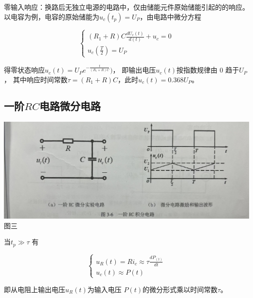 \documentclass[a4paper]{article}
\begin{document}
    {{零输入响应：换路后无独立电源的电路中，仅由储能元件原始储能引起的的响应。 以电容为例，电容的原始储能为$u_{c}(t_{p}) = U_{P}$，由电路中微分方程}}

    \begin{equation}
        \left\{
        \begin{array}{c}
        (R_{1}+R)
            C\frac{d U_{c}(t)}{d (t)}+u_{c}=0 \\
            u_{c}(\frac{T}{2})=U_{P}
        \end{array}
        \right.\label{eq:equation2}
    \end{equation}

    {{得零状态响应$u_{c}(t) = U_{P} e^{-\frac{t}{(R_{1}+R)C}})$， 即输出电压$u_{c}(t)$按指数规律由 0 趋于$U_{P}$， 其中响应时间常数$\tau =(R_{1}+R)C$，此时$u_{c}(t)=0.368U_{P}$。}}

    \subsection{一阶$RC$电路微分电路}\label{subsec:$rc$2}
    \begin{center}
        \includegraphics[scale=0.09]{2}\\
        {\small 图三}
    \end{center}

    {{当$t_{p}\gg\tau$ 有}}

    \begin{equation}
        \left\{
        \begin{array}{c}
            u_{R}(t)=Ri_{c} \approx \tau \frac{d P_(t)}{d t} \\
            u_{c}(t)\approx P(t)
        \end{array}
        \right.\label{eq:equation3}
    \end{equation}

    {{即从电阻上输出电压$u_{R}(t)$为输入电压 $P(t)$的微分形式乘以时间常数$\tau$。}}
\end{document}
